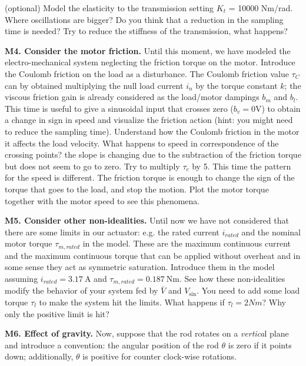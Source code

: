 \documentclass[11pt]{article}
\begin{document}
(optional) Model the  elasticity to the transmission setting $K_t$ = 10000 Nm/rad. Where oscillations are bigger? Do you think that a reduction in the sampling time is needed? Try to reduce the stiffness of the transmission, what happens?
%
%
\par
\textbf{M4. Consider the motor friction.} 
Until this moment, we have modeled the electro-mechanical system neglecting the friction torque on the motor. 
Introduce the Coulomb friction on the load as a disturbance. 
The Coulomb friction value $\tau_C$ can by obtained multiplying the null load current $i_n$ by the torque constant $k$; the viscous friction gain is already considered as the load/motor dampings $b_m$ and $b_l$. This time is useful to give a sinusoidal input that crosses zero ($b_v = 0 \mathrm{V}$)
to obtain a  change in sign in speed  and visualize the friction action (hint: you might need to reduce the sampling time). Understand how the Coulomb friction in the motor it affects the load velocity. 
What happens to speed in correspondence of the crossing points? the slope  is 
changing due to the subtraction of the friction torque but does not seem to go to zero. 
Try to multiply $\tau_c$ by 5. This time the pattern for the speed is different. 
The friction torque is enough to change the sign of the torque that goes to the load, 
and stop the motion. Plot the motor torque together with the motor speed to see this phenomena.
%
%
\par
\textbf{M5. Consider other non-idealities.} 
Until now we have not considered that there are some limits in our actuator: e.g. the rated 
current $i_{rated}$ and the nominal motor torque $\tau_{m, rated}$ in the model. 
These are the maximum continuous current and the 
maximum continuous torque that can be applied without overheat and 
in some sense they act as symmetric saturation. Introduce them in the model 
assuming $i_{rated} = 3.17 \ \mathrm{A}$ and $\tau_{m, rated} = 0.187 \ \mathrm{Nm}$. 
See how these non-idealities modify the behavior of your system fed by $\bar{V}$ and $V_{\sin}$.
You need to add some load torque $\tau_l$ to make the system hit the limits. What happens if $\tau_l = 2Nm$?
Why only the positive limit is hit?
%
%
\par
\textbf{M6. Effect of gravity.} 
Now, suppose that the rod rotates on a \textit{vertica}l plane and introduce a convention: the angular 
position of the rod $\theta$ is zero if it points down; additionally, $\theta$ is positive for counter clock-wise rotations. 
\end{document}
